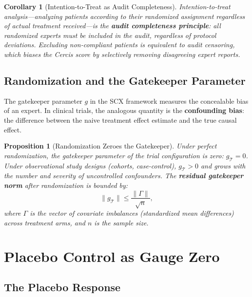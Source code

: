 \documentclass[12pt,a4paper]{article}
\newtheorem{proposition}[theorem]{Proposition}
\newtheorem{corollary}[theorem]{Corollary}
\theoremstyle{remark}
\newcommand{\SCX}{\textsf{SCX}}
\newcommand{\Cercis}{\textsf{Cercis}}
\begin{document}
\begin{corollary}[Intention-to-Treat as Audit Completeness]
\label{cor:itt}
Intention-to-treat analysis---analyzing patients according to their
randomized assignment regardless of actual treatment received---is the
\textbf{audit completeness principle}: all randomized experts must be
included in the audit, regardless of protocol deviations. Excluding
non-compliant patients is equivalent to audit censoring, which biases
the \Cercis{} score by selectively removing disagreeing expert reports.
\end{corollary}

\subsection{Randomization and the Gatekeeper Parameter}

The gatekeeper parameter $g$ in the \SCX{} framework measures the
concealable bias of an expert. In clinical trials, the analogous quantity
is the \textbf{confounding bias}: the difference between the naive
treatment effect estimate and the true causal effect.

\begin{proposition}[Randomization Zeroes the Gatekeeper]
\label{prop:randomization}
Under perfect randomization, the gatekeeper parameter of the trial
configuration is zero: $g_{\mathcal{T}} = 0$. Under observational study
designs (cohorts, case-control), $g_{\mathcal{T}} > 0$ and grows with
the number and severity of uncontrolled confounders. The \textbf{residual
gatekeeper norm} after randomization is bounded by:
\begin{equation}
  \|g_{\mathcal{T}}\| \leq \frac{\|\Gamma\|}{\sqrt{n}},
\end{equation}
where $\Gamma$ is the vector of covariate imbalances (standardized mean
differences) across treatment arms, and $n$ is the sample size.
\end{proposition}


\section{Placebo Control as Gauge Zero}
\label{sec:placebo}

\subsection{The Placebo Response}
\end{document}
